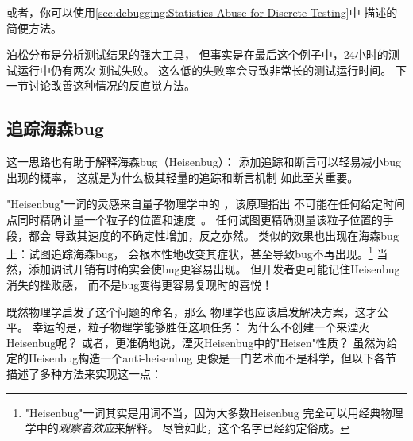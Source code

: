 {{	或者，你可以使用\cref{sec:debugging:Statistics Abuse for Discrete Testing}中
	描述的简便方法。
}\QuickQuizEndB
%
\QuickQuizEndE
}

泊松分布是分析测试结果的强大工具，
但事实是在最后这个例子中，24小时的测试运行中仍有两次
测试失败。
这么低的失败率会导致非常长的测试运行时间。
下一节讨论改善这种情况的反直觉方法。

\subsection{追踪海森bug}
\label{sec:debugging:Hunting Heisenbugs}

这一思路也有助于解释海森bug（Heisenbug）：
添加追踪和断言可以轻易减小bug出现的概率，
这就是为什么极其轻量的追踪和断言机制
如此至关重要。

"Heisenbug"一词的灵感来自量子物理学中的
，该原理指出
不可能在任何给定时间点同时精确计量一个粒子的位置和速度~\cite{WeinerHeisenberg1927Uncertain}。
任何试图更精确测量该粒子位置的手段，都会
导致其速度的不确定性增加，反之亦然。
类似的效果也出现在海森bug上：试图追踪海森bug，
会根本性地改变其症状，甚至导致bug不再出现。\footnote{
	"Heisenbug"一词其实是用词不当，因为大多数Heisenbug
	完全可以用经典物理学中的\emph{观察者效应}来解释。
	尽管如此，这个名字已经约定俗成。}
当然，添加调试开销有时确实会使bug更容易出现。
但开发者更可能记住Heisenbug消失的挫败感，
而不是bug变得更容易复现时的喜悦！

既然物理学启发了这个问题的命名，那么
物理学也应该启发解决方案，这才公平。
幸运的是，粒子物理学能够胜任这项任务：
为什么不创建一个来湮灭Heisenbug呢？
或者，更准确地说，湮灭Heisenbug中的"Heisen"性质？
虽然为给定的Heisenbug构造一个anti-heisenbug
更像是一门艺术而不是科学，但以下各节描述了多种方法来实现这一点：

